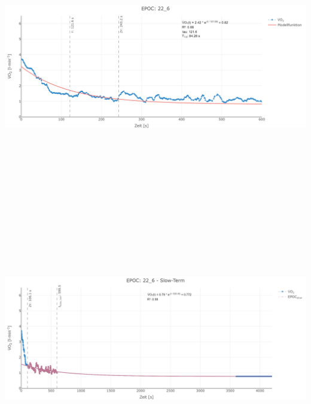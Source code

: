 \documentclass[
  letterpaper,
  DIV=11]{scrartcl}
\begin{document}
\includegraphics[width=11.45833in,height=4.6875in]{images/22_6_tau.png}
\includegraphics[width=11.45833in,height=4.6875in]{images/22_6_slow.png}
\end{document}
